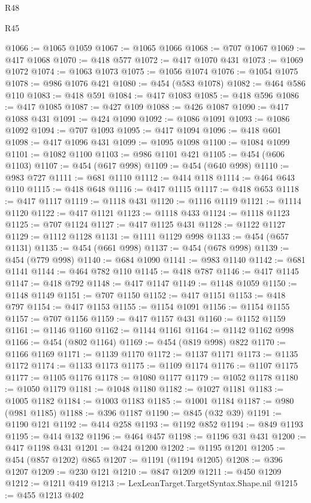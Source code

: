 \begin{lexlean}{R48}
\begin{lexlean}{R45}
\begin{coremodule}
{{{{{{{{{{{{{{{{{{{{{{{{{{{{{{{{{{{{{{{{{{{{{{{{{{{{{{{{{{{{{{{{{{{{{{{{{{{{{{{{{{{{{{{{{{{@1066 := @1065 @1059
@1067 := @1065 @1066
@1068 := @707 @1067
@1069 := @417 @1068
@1070 := @418 @577
@1072 := @417 @1070 @431
@1073 := @1069 @1072
@1074 := @1063 @1073
@1075 := @1056 @1074
@1076 := @1054 @1075
@1078 := @986 @1076 @421
@1080 := @454 (@583 @1078)
@1082 := @464 @586 @110
@1083 := @418 @591
@1084 := @417 @1083
@1085 := @418 @596
@1086 := @417 @1085
@1087 := @427 @109
@1088 := @426 @1087
@1090 := @417 @1088 @431
@1091 := @424 @1090
@1092 := @1086 @1091
@1093 := @1086 @1092
@1094 := @707 @1093
@1095 := @417 @1094
@1096 := @418 @601
@1098 := @417 @1096 @431
@1099 := @1095 @1098
@1100 := @1084 @1099
@1101 := @1082 @1100
@1103 := @986 @1101 @421
@1105 := @454 (@606 @1103)
@1107 := @454 (@617 @998)
@1109 := @454 (@640 @998)
@1110 := @983 @727
@1111 := @681 @1110
@1112 := @414 @118
@1114 := @464 @643 @110
@1115 := @418 @648
@1116 := @417 @1115
@1117 := @418 @653
@1118 := @417 @1117
@1119 := @1118 @431
@1120 := @1116 @1119
@1121 := @1114 @1120
@1122 := @417 @1121
@1123 := @1118 @433
@1124 := @1118 @1123
@1125 := @707 @1124
@1127 := @417 @1125 @431
@1128 := @1122 @1127
@1129 := @1112 @1128
@1131 := @1111 @1129 @998
@1133 := @454 (@657 @1131)
@1135 := @454 (@661 @998)
@1137 := @454 (@678 @998)
@1139 := @454 (@779 @998)
@1140 := @684 @1090
@1141 := @983 @1140
@1142 := @681 @1141
@1144 := @464 @782 @110
@1145 := @418 @787
@1146 := @417 @1145
@1147 := @418 @792
@1148 := @417 @1147
@1149 := @1148 @1059
@1150 := @1148 @1149
@1151 := @707 @1150
@1152 := @417 @1151
@1153 := @418 @797
@1154 := @417 @1153
@1155 := @1154 @1091
@1156 := @1154 @1155
@1157 := @707 @1156
@1159 := @417 @1157 @431
@1160 := @1152 @1159
@1161 := @1146 @1160
@1162 := @1144 @1161
@1164 := @1142 @1162 @998
@1166 := @454 (@802 @1164)
@1169 := @454 (@819 @998) @822
@1170 := @1166 @1169
@1171 := @1139 @1170
@1172 := @1137 @1171
@1173 := @1135 @1172
@1174 := @1133 @1173
@1175 := @1109 @1174
@1176 := @1107 @1175
@1177 := @1105 @1176
@1178 := @1080 @1177
@1179 := @1052 @1178
@1180 := @1050 @1179
@1181 := @1048 @1180
@1182 := @1027 @1181
@1183 := @1005 @1182
@1184 := @1003 @1183
@1185 := @1001 @1184
@1187 := @980 (@981 @1185)
@1188 := @396 @1187
@1190 := @845 (@32 @39)
@1191 := @1190 @121
@1192 := @414 @258
@1193 := @1192 @852
@1194 := @849 @1193
@1195 := @414 @132
@1196 := @464 @457
@1198 := @1196 @31 @431
@1200 := @417 @1198 @431
@1201 := @424 @1200
@1202 := @1195 @1201
@1205 := @454 (@857 @1202) @865
@1207 := @1191 (@1194 @1205)
@1208 := @396 @1207
@1209 := @230 @121
@1210 := @847 @1209
@1211 := @450 @1209
@1212 := @1211 @419
@1213 := LexLeanTarget.TargetSyntax.Shape.nil
@1215 := @455 @1213 @402
}}}}}}}}}}}}}}}}}}}}}}}}}}}}}}}}}}}}}}}}}}}}}}}}}}}}}}}}}}}}}}}}}}}}}}}}}}}}}}}}}}}}}}}}}}}
\end{coremodule}
\end{lexlean}
\end{lexlean}
